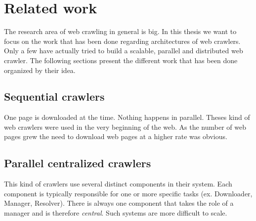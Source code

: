 \chapter{Related work} %
The research area of web crawling in general is big. In this thesis we want to focus on the work that has been done regarding architectures of web crawlers. Only a few have actually tried to build a scalable, parallel and distributed web crawler. The following sections present the different work that has been done organized by their idea.
\label{Chapter2} %

\section{Sequential crawlers}
One page is downloaded at the time. Nothing happens in parallel. Theses kind of web crawlers were used in the very beginning of the web. As the number of web pages grew the need to download web pages at a higher rate was obvious.

\section{Parallel centralized crawlers}
This kind of crawlers use several distinct components in their system. Each component is typically responsible for one or more specific tasks (ex. Downloader, Manager, Resolver). There is always one component that takes the role of a manager and is therefore \emph{central}. Such systems are more difficult to scale.

